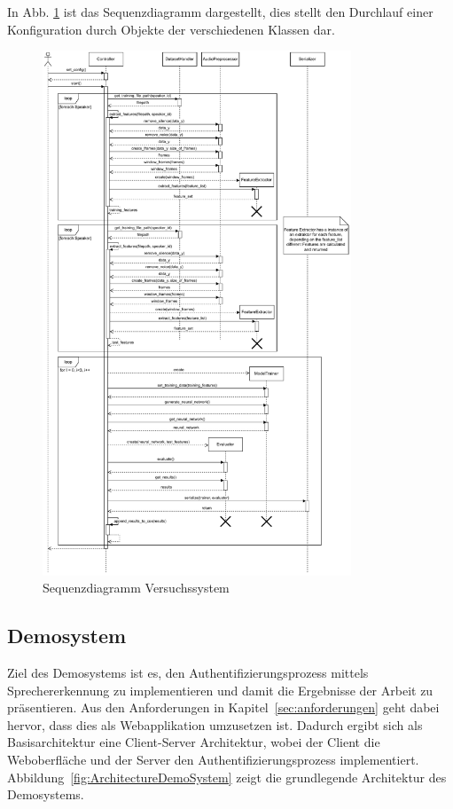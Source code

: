 In Abb. \ref{fig:sequenzdiagramm-versuchssystem} ist das Sequenzdiagramm dargestellt, dies stellt den Durchlauf einer Konfiguration durch Objekte der verschiedenen Klassen dar.
\begin{figure}[H]
    \centering
    \includegraphics[width=0.82\textwidth, keepaspectratio]{images/versuchssytem_sequenzdiagramm.pdf}
    \caption{Sequenzdiagramm Versuchssystem}
    \label{fig:sequenzdiagramm-versuchssystem}
\end{figure}\noindent





\subsection{Demosystem}
Ziel des Demosystems ist es, den Authentifizierungsprozess mittels Sprechererkennung zu implementieren und damit die Ergebnisse der Arbeit zu präsentieren.
Aus den Anforderungen in Kapitel~\ref{sec:anforderungen} geht dabei hervor, dass dies als Webapplikation umzusetzen ist.
Dadurch ergibt sich als Basisarchitektur eine Client-Server Architektur, wobei der Client die Weboberfläche und der Server den Authentifizierungsprozess implementiert.
Abbildung~\ref{fig:ArchitectureDemoSystem} zeigt die grundlegende Architektur des Demosystems.


